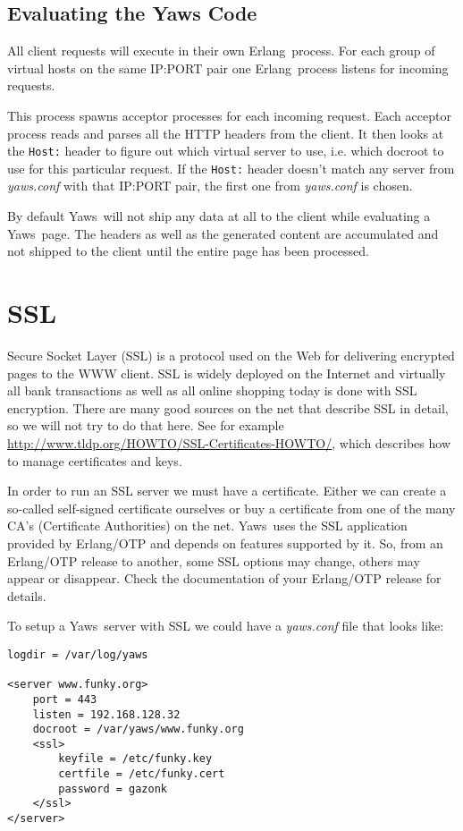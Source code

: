 \documentclass[11pt,oneside,english]{book}
\newcommand{\Erlang}            %
        {{\sc Erlang}}
\newcommand{\Yaws}            %
        {{\sc Yaws}}
\begin{document}
\section{Evaluating the Yaws Code}

All client requests will execute in their own \Erlang\  process.
For each group of virtual hosts on the same IP:PORT pair
one \Erlang\  process listens for incoming requests.

This process spawns acceptor processes for each incoming request.
Each acceptor process reads and parses all the HTTP headers from the
client. It then looks at the \verb+Host:+ header to figure out which
virtual server to use, i.e. which docroot to use for this particular
request. If the \verb+Host:+ header doesn't match any server from
\textit{yaws.conf} with that IP:PORT pair, the first one from
\textit{yaws.conf} is chosen.

By default \Yaws\  will not ship any data at all to the client
while evaluating a \Yaws\  page. The headers as well as the generated
content are accumulated and not shipped to the client until the
entire page has been processed.


\chapter{SSL}

Secure Socket Layer (SSL) is a protocol used on the Web for delivering
encrypted pages to the WWW client. SSL is widely deployed on the
Internet and virtually all bank transactions as well as all online
shopping today is done with SSL encryption. There are many good
sources on the net that describe SSL in detail, so we will not try to
do that here.  See for example
\url{http://www.tldp.org/HOWTO/SSL-Certificates-HOWTO/}, which
describes how to manage certificates and keys.

In order to run an SSL server we must have a certificate. Either we can
create a so-called self-signed certificate ourselves or buy a certificate
from one of the many CA's (Certificate Authorities) on the net. \Yaws\
uses the SSL application provided by Erlang/OTP and depends on features
supported by it. So, from an Erlang/OTP release to another, some SSL
options may change, others may appear or disappear. Check the
documentation of your Erlang/OTP release for details.

To setup a \Yaws\ server with SSL we could have a \textit{yaws.conf}
file that looks like:

\begin{verbatim}
logdir = /var/log/yaws

<server www.funky.org>
    port = 443
    listen = 192.168.128.32
    docroot = /var/yaws/www.funky.org
    <ssl>
        keyfile = /etc/funky.key
        certfile = /etc/funky.cert
        password = gazonk
    </ssl>
</server>
\end{verbatim}
\end{document}
